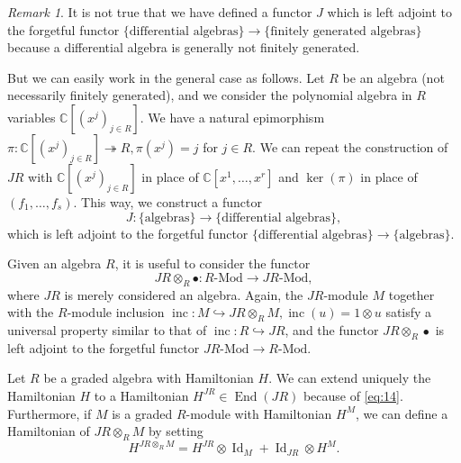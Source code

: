\documentclass[a4paper, 12pt, reqno]{amsart}
\theoremstyle{remark}
\newtheorem{remark}[theorem]{Remark}
\DeclareMathOperator{\End}{End}
\DeclareMathOperator{\Id}{Id}
\DeclareMathOperator{\inc}{inc}
\begin{document}
\begin{remark}
  \label{rmk:8}
  It is not true that we have defined a functor $J$ which is left adjoint to the forgetful functor $\{\text{differential algebras}\} \to \{\text{finitely generated algebras}\}$ because a differential algebra is generally not finitely generated.

  But we can easily work in the general case as follows.
  Let $R$ be an algebra (not necessarily finitely generated), and we consider the polynomial algebra in $R$ variables $\mathbb{C}[(x^j)_{j \in R}]$.
  We have a natural epimorphism $\pi: \mathbb{C}[(x^j)_{j \in R}] \twoheadrightarrow R, \pi(x^j) = j$ for $j \in R$.
  We can repeat the construction of $JR$ with $\mathbb{C}[(x^j)_{j \in R}]$ in place of $\mathbb{C}[x^1, \dots, x^r]$ and $\ker(\pi)$ in place of $(f_1, \dots, f_s)$.
  This way, we construct a functor
  \begin{equation*}
    J: \{\text{algebras}\} \to \{\text{differential algebras}\},
  \end{equation*}
  which is left adjoint to the forgetful functor $\{\text{differential algebras}\} \to \{\text{algebras}\}$.
\end{remark}

Given an algebra $R$, it is useful to consider the functor
\begin{equation*}
  JR \otimes_R \bullet: \text{$R$-Mod} \to \text{$JR$-Mod},
\end{equation*}
where $JR$ is merely considered an algebra.
Again, the $JR$-module $M$ together with the $R$-module inclusion $\inc: M \hookrightarrow JR \otimes_R M, \inc(u) = 1\otimes u$ satisfy a universal property similar to that of $\inc: R \hookrightarrow JR$, and the functor $JR \otimes_R \bullet$ is left adjoint to the forgetful functor $\text{$JR$-Mod} \to \text{$R$-Mod}$.

Let $R$ be a graded algebra with Hamiltonian $H$.
We can extend uniquely the Hamiltonian $H$ to a Hamiltonian $H^{JR} \in \End(JR)$ because of \eqref{eq:14}.
Furthermore, if $M$ is a graded $R$-module with Hamiltonian $H^M$, we can define a Hamiltonian of $JR \otimes_R M$ by setting
\begin{equation*}
  H^{JR \otimes_R M} = H^{JR}\otimes\Id_{M} + \Id_{JR}\otimes H^M.
\end{equation*}



\end{document}
